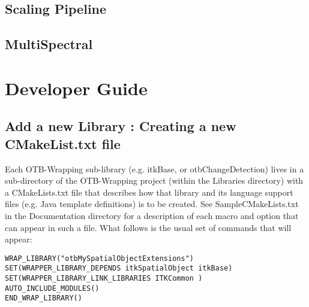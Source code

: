 \subsection{Scaling Pipeline}
%

\subsection{MultiSpectral}
%

% 



\section{Developer Guide}\label{sec:dev}

\subsection{Add a new Library : Creating a new CMakeList.txt file}
Each OTB-Wrapping sub-library (e.g. itkBase, or otbChangeDetection) 
lives in a sub-directory of the OTB-Wrapping project (within the Libraries directory)
 with a CMakeLists.txt file that describes how that library and its language support files 
(e.g. Java template definitions) is to be created. 
See SampleCMakeLists.txt in the Documentation directory for a description of each macro and option that
can appear in such a file. What follows is the usual set of commands that will appear:

\small
\verb$WRAP_LIBRARY("otbMySpatialObjectExtensions")$ \\
\verb$SET(WRAPPER_LIBRARY_DEPENDS itkSpatialObject itkBase)$ \\
\verb$SET(WRAPPER_LIBRARY_LINK_LIBRARIES ITKCommon )$ \\
\verb$AUTO_INCLUDE_MODULES()$ \\
\verb$END_WRAP_LIBRARY()$ \\
\normalsize

